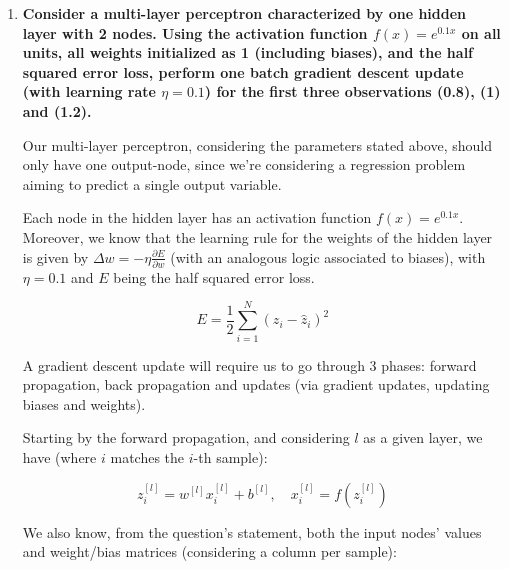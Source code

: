 \documentclass[12pt]{article}
\begin{document}
\begin{enumerate}[leftmargin=\labelsep]
        \pagebreak

  \item \textbf{Consider a multi-layer perceptron characterized by one hidden layer with 2 nodes.
          Using the activation function $f(x) = e^{0.1x}$ on all units, all weights
          initialized as 1 (including biases), and the half squared error loss, perform
          one batch gradient descent update (with learning rate $\eta = 0.1$)
          for the first three observations (0.8), (1) and (1.2).
        }

        Our multi-layer perceptron, considering the parameters stated above, should only
        have one output-node, since we're considering a regression problem aiming to
        predict a single output variable.

        Each node in the hidden layer has an activation function $f(x) = e^{0.1x}$.
        Moreover, we know that the learning rule for the weights of the hidden layer
        is given by $\Delta w = - \eta \frac{\partial E}{\partial w}$ (with an analogous
        logic associated to biases), with $\eta = 0.1$ and $E$ being the half squared error loss.

        \begin{equation*}
          E = \frac{1}{2} \sum_{i=1}^N (z_i - \hat{z}_i)^2
        \end{equation*}

        A gradient descent update will require us to go through 3 phases: forward
        propagation, back propagation and updates (via gradient updates, updating
        biases and weights).

        Starting by the forward propagation, and considering $l$ as a given layer,
        we have (where $i$ matches the $i$-th sample):

        \begin{equation*}
          z_i^{[l]} = w^{[l]} x_i^{[l]} + b^{[l]}, \quad x_i^{[l]} = f(z_i^{[l]})
        \end{equation*}

        We also know, from the question's statement, both the input nodes' values
        and weight/bias matrices (considering a column per sample):


\end{enumerate}
\end{document}
